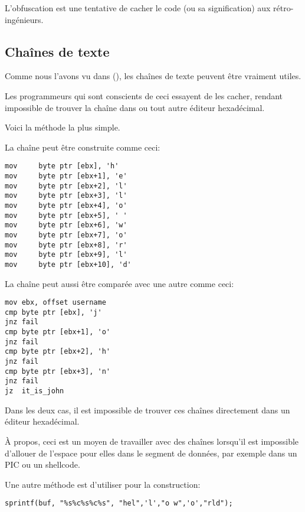 
L'obfuscation est une tentative de cacher le code (ou sa signification) aux rétro-ingénieurs.

\subsection{Chaînes de texte}

Comme nous l'avons vu dans (), les chaînes de texte peuvent
être vraiment utiles.

Les programmeurs qui sont conscients de ceci essayent de les cacher, rendant impossible
de trouver la chaîne dans \IDA{} ou tout autre éditeur hexadécimal.

Voici la méthode la plus simple.

La chaîne peut être construite comme ceci:

\begin{lstlisting}[style=customasmx86]
mov     byte ptr [ebx], 'h'
mov     byte ptr [ebx+1], 'e'
mov     byte ptr [ebx+2], 'l'
mov     byte ptr [ebx+3], 'l'
mov     byte ptr [ebx+4], 'o'
mov     byte ptr [ebx+5], ' '
mov     byte ptr [ebx+6], 'w'
mov     byte ptr [ebx+7], 'o'
mov     byte ptr [ebx+8], 'r'
mov     byte ptr [ebx+9], 'l'
mov     byte ptr [ebx+10], 'd'
\end{lstlisting}

La chaîne peut aussi être comparée avec une autre comme ceci:

\begin{lstlisting}[style=customasmx86]
mov	ebx, offset username
cmp	byte ptr [ebx], 'j'
jnz	fail
cmp	byte ptr [ebx+1], 'o'
jnz	fail
cmp	byte ptr [ebx+2], 'h'
jnz	fail
cmp	byte ptr [ebx+3], 'n'
jnz	fail
jz	it_is_john
\end{lstlisting}

Dans les deux cas, il est impossible de trouver ces chaînes directement dans un éditeur
hexadécimal.


À propos, ceci est un moyen de travailler avec des chaînes lorsqu'il est impossible
d'allouer de l'espace pour elles dans le segment de données, par exemple dans un
\ac{PIC} ou un shellcode.

Une autre méthode est d'utiliser  pour la construction:

\begin{lstlisting}[style=customc]
sprintf(buf, "%s%c%s%c%s", "hel",'l',"o w",'o',"rld");
\end{lstlisting}

